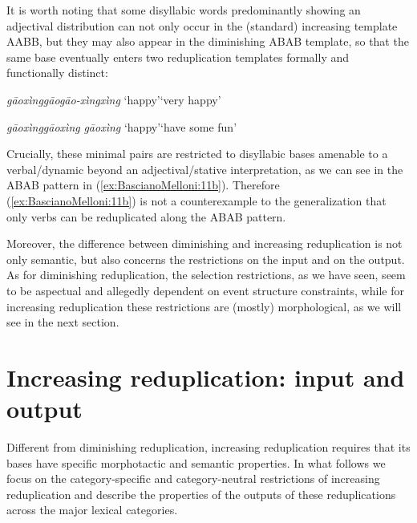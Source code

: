 \documentclass[output=paper]{langsci/langscibook}
\begin{document}
It is worth noting that some disyllabic words predominantly showing an
adjectival distribution can not only occur in the (standard) increasing
template AABB, but they may also appear in the diminishing ABAB
template, so that the same base eventually enters two reduplication
templates formally and functionally distinct:

\ea\label{ex:BascianoMelloni:11}

    \ea\label{ex:BascianoMelloni:11a}%
            {\emph{gāoxìng}}{\emph{gāo}\tld{}\emph{gāo-xìng}\tld{}\emph{xìng}}%
            {`happy'}{`very happy'}%

    \ex\label{ex:BascianoMelloni:11b}%
            {\emph{gāoxìng}}{\emph{gāoxìng} \emph{gāoxìng}}%
            {`happy'}{`have some fun'}%
\z\z

Crucially, these minimal pairs are restricted to disyllabic bases
amenable to a verbal/dynamic beyond an adjectival/stative
interpretation, as we can see in the ABAB pattern in (\ref{ex:BascianoMelloni:11b}). Therefore
(\ref{ex:BascianoMelloni:11b}) is not a counterexample to the generalization that only verbs can
be reduplicated along the ABAB pattern.

Moreover, the difference between diminishing and increasing
reduplication is not only semantic, but also concerns the restrictions
on the input and on the output. As for diminishing reduplication, the
selection restrictions, as we have seen, seem to be aspectual and
allegedly dependent on event structure constraints, while for increasing
reduplication these restrictions are (mostly) morphological, as we will
see in the next section.

\section{Increasing reduplication: input and output}

Different from diminishing reduplication, increasing reduplication
requires that its bases have specific morphotactic and semantic
properties. In what follows we focus on the category-specific and
category-neutral restrictions of increasing reduplication and describe
the properties of the outputs of these reduplications across the major
lexical categories.
\end{document}
